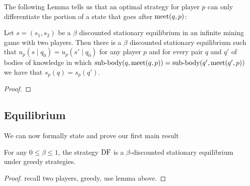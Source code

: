 
The following Lemma tells us that an optimal strategy for player $p$ can only differentiate the portion of 
a state that goes after $\text{\rm meet}(q,p)$: 

\begin{mylem}
Let $s = (s_1,s_2)$ be a $\beta$ discounted stationary equilibrium in an infinite mining game with two players. 
Then there is a $\beta$ discounted stationary equilibrium such that $u_p(s \mid q_0) = u_p(s' \mid q_0)$ for 
any player $p$ and for every pair $q$ and $q'$ of 
bodies of knowledge in which ${\text{\rm sub-body}}(q,\text{\rm meet}(q,p)) = {\text{\rm sub-body}}(q',\text{\rm meet}(q',p))$ we have that 
$s_p(q) = s_p(q')$. 
\end{mylem}

\begin{proof}
\end{proof}

\subsection{Equilibrium}

We can now formally state and prove our first main result

\begin{mythm}
For any $0 \leq \beta \leq 1$, the strategy $\text{\rm DF}$ is a $\beta$-discounted stationary equilibrium under greedy strategies. 
\end{mythm} 

\begin{proof}
recall two players, greedy, use lemma above. 
\end{proof}
